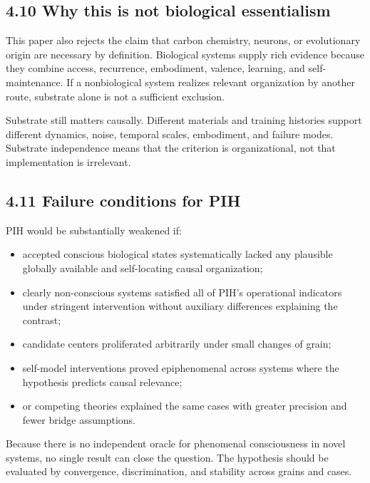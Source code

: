 \documentclass[
  11pt,
]{article}
\providecommand{\tightlist}{%
  \setlength{\itemsep}{0pt}\setlength{\parskip}{0pt}}
\begin{document}
\subsection{4.10 Why this is not biological
essentialism}\label{why-this-is-not-biological-essentialism}

This paper also rejects the claim that carbon chemistry, neurons, or
evolutionary origin are necessary by definition. Biological systems
supply rich evidence because they combine access, recurrence,
embodiment, valence, learning, and self-maintenance. If a nonbiological
system realizes relevant organization by another route, substrate alone
is not a sufficient exclusion.

Substrate still matters causally. Different materials and training
histories support different dynamics, noise, temporal scales,
embodiment, and failure modes. Substrate independence means that the
criterion is organizational, not that implementation is irrelevant.

\subsection{4.11 Failure conditions for
PIH}\label{failure-conditions-for-pih}

PIH would be substantially weakened if:

\begin{itemize}
\tightlist
\item
  accepted conscious biological states systematically lacked any
  plausible globally available and self-locating causal organization;
\item
  clearly non-conscious systems satisfied all of PIH's operational
  indicators under stringent intervention without auxiliary differences
  explaining the contrast;
\item
  candidate centers proliferated arbitrarily under small changes of
  grain;
\item
  self-model interventions proved epiphenomenal across systems where the
  hypothesis predicts causal relevance;
\item
  or competing theories explained the same cases with greater precision
  and fewer bridge assumptions.
\end{itemize}

Because there is no independent oracle for phenomenal consciousness in
novel systems, no single result can close the question. The hypothesis
should be evaluated by convergence, discrimination, and stability across
grains and cases.
\end{document}
